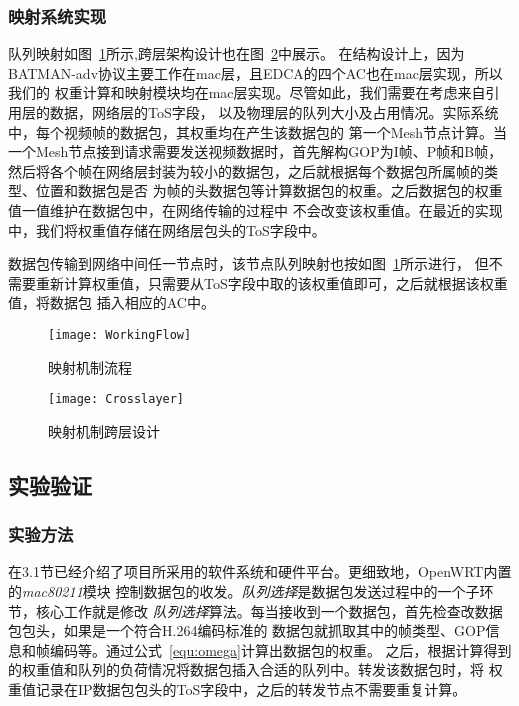 \subsubsection{映射系统实现}
队列映射如图~\ref{fig:workingflow}所示,跨层架构设计也在图~\ref{fig:crosslayer}中展示。
在结构设计上，因为BATMAN-adv协议主要工作在mac层，且EDCA的四个AC也在mac层实现，所以我们的
权重计算和映射模块均在mac层实现。尽管如此，我们需要在考虑来自引用层的数据，网络层的ToS字段，
以及物理层的队列大小及占用情况。实际系统中，每个视频帧的数据包，其权重均在产生该数据包的
第一个Mesh节点计算。当一个Mesh节点接到请求需要发送视频数据时，首先解构GOP为I帧、P帧和B帧，
然后将各个帧在网络层封装为较小的数据包，之后就根据每个数据包所属帧的类型、位置和数据包是否
为帧的头数据包等计算数据包的权重。之后数据包的权重值一值维护在数据包中，在网络传输的过程中
不会改变该权重值。在最近的实现中，我们将权重值存储在网络层包头的ToS字段中。

数据包传输到网络中间任一节点时，该节点队列映射也按如图~\ref{fig:workingflow}所示进行，
但不需要重新计算权重值，只需要从ToS字段中取的该权重值即可，之后就根据该权重值，将数据包
插入相应的AC中。

\begin{figure}[H] %
  \centering
  \texttt{[image: WorkingFlow]}
  \caption{映射机制流程}
  \label{fig:workingflow}
\end{figure}
\begin{figure}[H] %
  \centering
  \texttt{[image: Crosslayer]}
  \caption{映射机制跨层设计}
  \label{fig:crosslayer}
\end{figure}

\subsection{实验验证}
\renewcommand{\thesubsubsection}{\Alph{subsubsection}.}
\subsubsection{实验方法}
在3.1节已经介绍了项目所采用的软件系统和硬件平台。更细致地，OpenWRT内置的\emph{mac80211}模块
控制数据包的收发。\emph{队列选择}是数据包发送过程中的一个子环节，核心工作就是修改\emph{
队列选择}算法。每当接收到一个数据包，首先检查改数据包包头，如果是一个符合H.264编码标准的
数据包就抓取其中的帧类型、GOP信息和帧编码等。通过公式~\ref{equ:omega}计算出数据包的权重。
之后，根据计算得到的权重值和队列的负荷情况将数据包插入合适的队列中。转发该数据包时，将
权重值记录在IP数据包包头的ToS字段中，之后的转发节点不需要重复计算。

